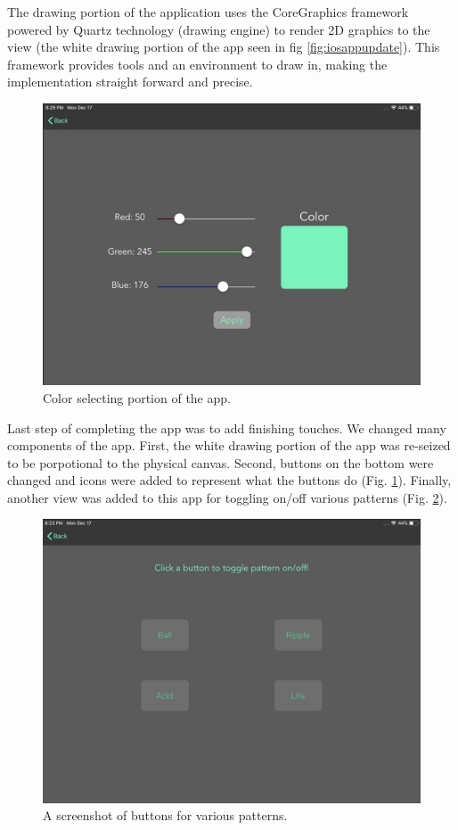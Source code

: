 \documentclass[11pt]{IEEEtran}
\begin{document}
The drawing portion of the application uses the CoreGraphics framework powered by Quartz technology (drawing engine) to render 2D graphics to the view (the white drawing portion of the app seen in fig \ref{fig:iosappupdate}). This framework provides tools and an environment to draw in, making the implementation straight forward and precise.

\begin{figure}[H]
  \centering
  \includegraphics[width=\columnwidth]{ios_app_updated1.jpg}
  \caption{Color selecting portion of the app.}
  \label{fig:iosappupdate1}
\end{figure}

Last step of completing the app was to add finishing touches. We changed many components of the app. First, the white drawing portion of the app was re-seized to be porpotional to the physical canvas. Second, buttons on the bottom were changed and icons were added to represent what the buttons do (Fig. \ref{fig:iosappupdate1}). Finally, another view was added to this app for toggling on/off various patterns (Fig. \ref{fig:iosappupdate2}).

\begin{figure}[H]
  \centering
  \includegraphics[width=\columnwidth]{ios_app_updated2.jpg}
  \caption{A screenshot of buttons for various patterns.}
  \label{fig:iosappupdate2}
\end{figure}
\end{document}
